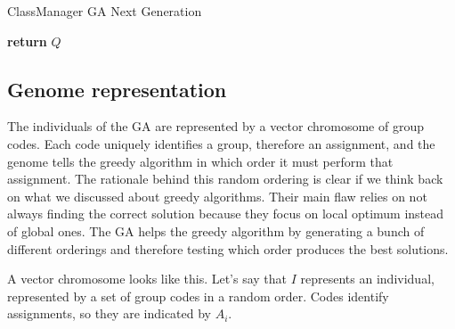 \begin{algorithm}[H]
    \caption{ClassManager GA Next Generation}
    \label{cm-ga-ng}
    \begin{algorithmic}[1]
                \EndIf
                \EndIf
            \EndFor
            \State \textbf{return} $Q$
        \EndProcedure
    \end{algorithmic}
\end{algorithm}

\subsection{Genome representation}

The individuals of the GA are represented by a vector chromosome of group codes. Each code uniquely identifies a group, therefore an assignment, and the genome tells the greedy algorithm in which order it must perform that assignment. The rationale behind this random ordering is clear if we think back on what we discussed about greedy algorithms. Their main flaw relies on not always finding the correct solution because they focus on local optimum instead of global ones. The GA helps the greedy algorithm by generating a bunch of different orderings and therefore testing which order produces the best solutions.

A vector chromosome looks like this. Let's say that $I$ represents an individual, represented by a set of group codes in a random order. Codes identify assignments, so they are indicated by $A_{i}$.

